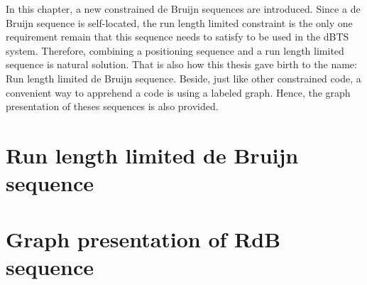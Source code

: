 In this chapter, a new constrained de Bruijn sequences are introduced. Since a de Bruijn sequence is self-located, the run length limited constraint is the only one requirement remain that this sequence needs to satisfy to be used in the \gls{dBTS} system. Therefore, combining a positioning sequence and a run length limited sequence is natural solution. That is also how this thesis gave birth to the name: Run length limited de Bruijn sequence. Beside, just like other constrained code, a convenient way to apprehend a code is using a labeled graph. Hence, the graph presentation of theses sequences is also provided. 

\section{Run length limited de Bruijn sequence}



\section{Graph presentation of RdB sequence}








